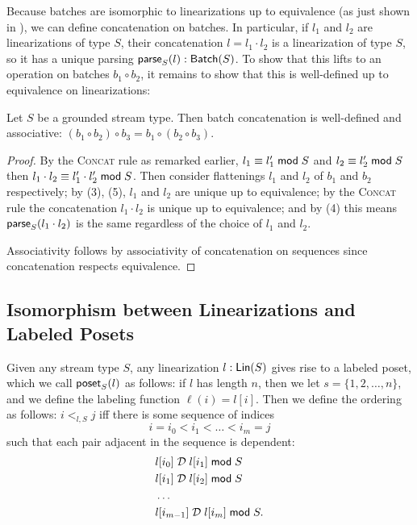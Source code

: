 Because batches are isomorphic to linearizations up to equivalence (as just shown in ), we can define concatenation on batches. In particular, if $l_1$ and $l_2$ are linearizations of type $S$,
their concatenation $l = l_1 \cdot l_2$ is a linearization of type $S$,
so it has a unique parsing $\batchtype{\parselin{l}{S}}{S}$.
To show that this lifts to an operation on batches $b_1 \circ b_2$, it remains to show that this is well-defined up to equivalence on linearizations:
\begin{proposition}
\label{batch-concatenation-well-defined}
Let $S$ be a grounded stream type.
Then batch concatenation is well-defined and associative: $(b_1 \circ b_2) \circ b_3 = b_1 \circ (b_2 \circ b_3)$.
\end{proposition}
\begin{proof}
By the \textsc{Concat} rule as remarked earlier, $\equivtype{l_1}{l_1'}{S}$ and $\equivtype{l_2}{l_2'}{S}$
then $\equivtype{l_1 \cdot l_2}{l_1' \cdot l_2'}{S}$.
Then consider flattenings $l_1$ and $l_2$ of $b_1$ and $b_2$ respectively;
by  (3), (5),
$l_1$ and $l_2$ are unique up to equivalence;
by the \textsc{Concat} rule the concatenation $l_1 \cdot l_2$ is unique up to equivalence;
and by  (4)
this means $\parselin{l_1 \cdot l_2}{S}$ is the same regardless of the choice of $l_1$ and $l_2$.

Associativity follows by associativity of concatenation on sequences since concatenation respects equivalence.
\end{proof}

\subsection{Isomorphism between Linearizations and Labeled Posets}

Given any stream type $S$, any linearization $\lintype{l}{S}$ gives rise to a labeled poset, which we call $\posetlin{l}{S}$ as follows:
if $l$ has length $n$, then we let $s = \{1, 2, \ldots, n\}$, and we define the labeling function $\ell(i) = l[i]$.
Then we define the ordering as follows:
$i <_{l, S} j$ iff there is some sequence of indices
\[
i = i_0 < i_1 < \ldots < i_m = j
\]
such that each pair adjacent in the sequence is dependent:
\begin{align*}
&\deptype{l[i_0]}{l[i_1]}{S} \\
&\deptype{l[i_1]}{l[i_2]}{S} \\
&\ldots \\
&\deptype{l[i_{m-1}]}{l[i_m]}{S}.
\end{align*}

